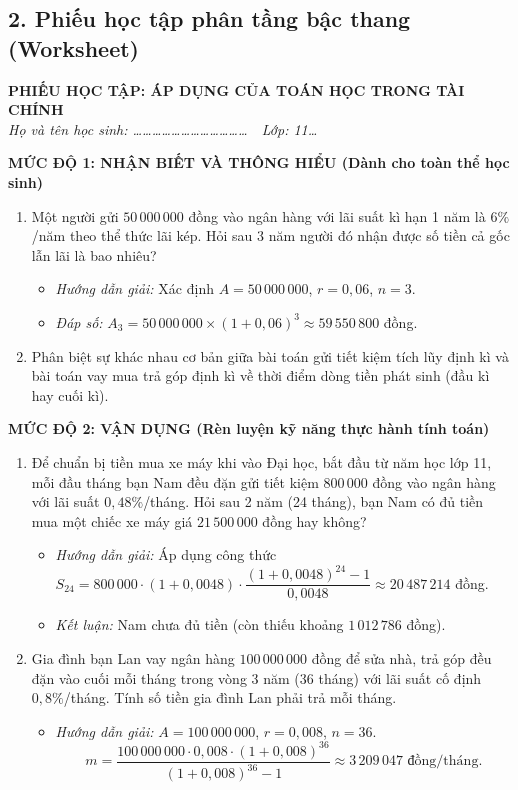 \documentclass[12pt, a4paper]{article}
\begin{document}
\subsection*{2. Phiếu học tập phân tầng bậc thang (Worksheet)}

\begin{center}
    \textbf{PHIẾU HỌC TẬP: ÁP DỤNG CỦA TOÁN HỌC TRONG TÀI CHÍNH}\\
    \textit{Họ và tên học sinh: \dots\dots\dots\dots\dots\dots\dots\dots\dots\dots\dots\dots \ \textbar \ Lớp: 11\dots}
\end{center}

\noindent \textbf{MỨC ĐỘ 1: NHẬN BIẾT VÀ THÔNG HIỂU (Dành cho toàn thể học sinh)}
\begin{enumerate}
    \item Một người gửi $50\,000\,000$ đồng vào ngân hàng với lãi suất kì hạn 1 năm là $6\%$/năm theo thể thức lãi kép. Hỏi sau 3 năm người đó nhận được số tiền cả gốc lẫn lãi là bao nhiêu?
    \begin{itemize}
        \item \textit{Hướng dẫn giải:} Xác định $A = 50\,000\,000$, $r = 0{,}06$, $n = 3$.
        \item \textit{Đáp số:} $A_3 = 50\,000\,000 \times (1 + 0{,}06)^3 \approx 59\,550\,800$ đồng.
    \end{itemize}
    \item Phân biệt sự khác nhau cơ bản giữa bài toán gửi tiết kiệm tích lũy định kì và bài toán vay mua trả góp định kì về thời điểm dòng tiền phát sinh (đầu kì hay cuối kì).
\end{enumerate}

\noindent \textbf{MỨC ĐỘ 2: VẬN DỤNG (Rèn luyện kỹ năng thực hành tính toán)}
\begin{enumerate}
    \item Để chuẩn bị tiền mua xe máy khi vào Đại học, bắt đầu từ năm học lớp 11, mỗi đầu tháng bạn Nam đều đặn gửi tiết kiệm $800\,000$ đồng vào ngân hàng với lãi suất $0{,}48\%$/tháng. Hỏi sau 2 năm (24 tháng), bạn Nam có đủ tiền mua một chiếc xe máy giá $21\,500\,000$ đồng hay không?
    \begin{itemize}
        \item \textit{Hướng dẫn giải:} Áp dụng công thức $S_{24} = 800\,000 \cdot (1 + 0{,}0048) \cdot \dfrac{(1 + 0{,}0048)^{24} - 1}{0{,}0048} \approx 20\,487\,214$ đồng.
        \item \textit{Kết luận:} Nam chưa đủ tiền (còn thiếu khoảng $1\,012\,786$ đồng).
    \end{itemize}
    \item Gia đình bạn Lan vay ngân hàng $100\,000\,000$ đồng để sửa nhà, trả góp đều đặn vào cuối mỗi tháng trong vòng 3 năm (36 tháng) với lãi suất cố định $0{,}8\%$/tháng. Tính số tiền gia đình Lan phải trả mỗi tháng.
    \begin{itemize}
        \item \textit{Hướng dẫn giải:} $A = 100\,000\,000$, $r = 0{,}008$, $n = 36$.
        $$m = \dfrac{100\,000\,000 \cdot 0{,}008 \cdot (1 + 0{,}008)^{36}}{(1 + 0{,}008)^{36} - 1} \approx 3\,209\,047\text{ đồng/tháng.}$$
    \end{itemize}
\end{enumerate}
\end{document}
